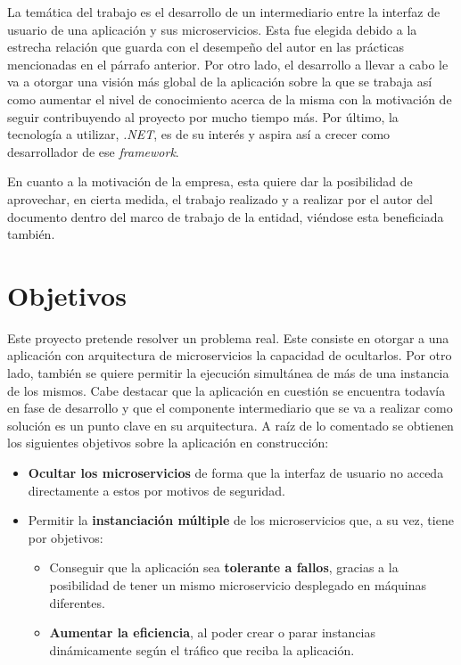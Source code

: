 \documentclass[11pt,spanish,listoffigures]{tfgetsinf}
\begin{document}
La temática del trabajo es el desarrollo de un intermediario entre la interfaz de usuario de una aplicación y sus microservicios. Esta fue elegida debido a la estrecha relación que guarda con el desempeño del autor en las prácticas mencionadas en el párrafo anterior. Por otro lado, el desarrollo a llevar a cabo le va a otorgar una visión más global de la aplicación sobre la que se trabaja así como aumentar el nivel de conocimiento acerca de la misma con la motivación de seguir contribuyendo al proyecto por mucho tiempo más. Por último, la tecnología a utilizar, \emph{.NET}, es de su interés y aspira así a crecer como desarrollador de ese \emph{framework}.

En cuanto a la motivación de la empresa, esta quiere dar la posibilidad de aprovechar, en cierta medida, el trabajo realizado y a realizar por el autor del documento dentro del marco de trabajo de la entidad, viéndose esta beneficiada también.

\section{Objetivos}

Este proyecto pretende resolver un problema real. Este consiste en otorgar a una aplicación con arquitectura de microservicios la capacidad de ocultarlos. Por otro lado, también se quiere permitir la ejecución simultánea de más de una instancia de los mismos. Cabe destacar que la aplicación en cuestión se encuentra todavía en fase de desarrollo y que el componente intermediario que se va a realizar como solución es un punto clave en su arquitectura. A raíz de lo comentado se obtienen los siguientes objetivos sobre la aplicación en construcción:

\begin{itemize}

	\item \textbf{Ocultar los microservicios} de forma que la interfaz de usuario no acceda directamente a estos por motivos de seguridad.
	
	\item Permitir la \textbf{instanciación múltiple} de los microservicios que, a su vez, tiene por objetivos:
		\begin{itemize}
		
			\item Conseguir que la aplicación sea \textbf{tolerante a fallos}, gracias a la posibilidad de tener un mismo microservicio desplegado en máquinas diferentes.
			
			\item \textbf{Aumentar la eficiencia}, al poder crear o parar instancias dinámicamente según el tráfico que reciba la aplicación.
			
		\end{itemize}

\end{itemize}
\end{document}
